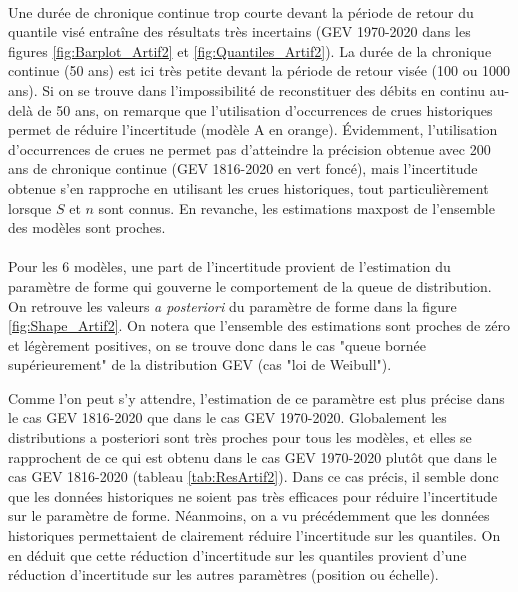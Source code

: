 	\paragraph{} Une durée de chronique continue trop courte devant la période de retour du quantile visé entraîne des résultats très incertains (GEV 1970-2020 dans les figures \ref{fig:Barplot_Artif2} et \ref{fig:Quantiles_Artif2}). La durée de la chronique continue (50 ans) est ici très petite devant la période de retour visée (100 ou 1000 ans). Si on se trouve dans l'impossibilité de reconstituer des débits en continu au-delà de 50 ans, on remarque que l'utilisation d'occurrences de crues historiques permet de réduire l'incertitude (modèle A en orange). Évidemment, l'utilisation d'occurrences de crues ne permet pas d'atteindre la précision obtenue avec 200 ans de chronique continue (GEV 1816-2020 en vert foncé), mais l'incertitude obtenue s'en rapproche en utilisant les crues historiques, tout particulièrement lorsque $S$ et $n$ sont connus. En revanche, les estimations maxpost de l'ensemble des modèles sont proches. 
	
	\paragraph{} Pour les 6 modèles, une part de l'incertitude provient de l'estimation du paramètre de forme qui gouverne le comportement de la queue de distribution. On retrouve les valeurs \textit{a posteriori} du paramètre de forme dans la figure \ref{fig:Shape_Artif2}. On notera que l'ensemble des estimations sont proches de zéro et légèrement positives, on se trouve donc dans le cas "queue bornée supérieurement" de la distribution GEV (cas "loi de Weibull"). 
	
	Comme l'on peut s'y attendre, l'estimation de ce paramètre est plus précise dans le cas GEV 1816-2020 que dans le cas GEV 1970-2020. Globalement les distributions a posteriori sont très proches pour tous les modèles, et elles se rapprochent de ce qui est obtenu dans le cas GEV 1970-2020 plutôt que dans le cas GEV 1816-2020 (tableau \ref{tab:ResArtif2}). Dans ce cas précis, il semble donc que les données historiques ne soient pas très efficaces pour réduire l'incertitude sur le paramètre de forme. Néanmoins, on a vu précédemment que les données historiques permettaient de clairement réduire l'incertitude sur les quantiles. On en déduit que cette réduction d'incertitude sur les quantiles provient d'une réduction d'incertitude sur les autres paramètres (position ou échelle). 

